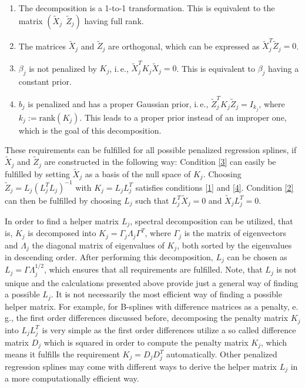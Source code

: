 \documentclass[12pt]{article}
\begin{document}
\begin{enumerate}
\item The decomposition is a 1-to-1 transformation. This is equivalent to the matrix $(\tilde{X}_j \:\:  \tilde{Z}_j)$ having full rank. \label{1}
\item The matrices $\tilde{X}_j$ and $\tilde{Z}_j$ are orthogonal, which can be expressed as $\tilde{X}_j^T \tilde{Z}_j = 0$. \label{2}
\item $\beta_j$ is not penalized by $K_j$, i.\,e., $\tilde{X}_j^T K_j \tilde{X}_j = 0$. This is equivalent to $\beta_j$ having a constant prior. \label{3}
\item $b_j$ is penalized and has a proper Gaussian prior, i.\,e., $\tilde{Z}_j^T K_j \tilde{Z}_j = I_{k_j}$, 
where $k_j := \text{rank}(K_j)$. This leads to a proper prior instead of an improper one, which is the goal of this decomposition. \label{4}
\end{enumerate}

These requirements can be fulfilled for all possible penalized regression splines, if $\tilde{X}_j$ and $\tilde{Z}_j$ are constructed in the following way: Condition \ref{3} can easily be fulfilled by setting $\tilde{X}_j$ as a basis of the null space of $K_j$. Choosing $\tilde{Z}_j =L_j (L_j^T L_j)^{-1}$ with $K_j =L_j L_j^T$ satisfies conditions \ref{1} and \ref{4}.  Condition \ref{2} can then be fulfilled by choosing $L_j$ such that $L_j^T\tilde{X}_j = 0$ and $\tilde{X}_jL_j^T = 0$.

 
In order to find a helper matrix $L_j$, spectral decomposition can be utilized, that is, $K_j$ is decomposed into $K_j = \Gamma_j \Lambda_j \Gamma^T$, where $\Gamma_j$ is the matrix of eigenvectors and $\Lambda_j$ the diagonal matrix of eigenvalues of $K_j$, both sorted by the eigenvalues in descending order. After performing this decomposition, $L_j$ can be chosen as $L_j = \Gamma \Lambda_j^{1/2}$, which ensures that all requirements are fulfilled. Note, that $L_j$ is not unique and the calculations presented above provide just a general way of finding a possible $L_j$. It is not necessarily the most efficient way of finding a possible helper matrix. For example, for B-splines with difference matrices as a penalty, e.\,g., the first order differences discussed before, decomposing the penalty matrix $K_j$ into $L_j L_j^T$ is very simple as the first order differences utilize a so called difference matrix $D_j$ which is squared in order to compute the penalty matrix $K_j$, which means it fulfills the requirement $K_j = D_jD_j^T$  automatically. Other penalized regression splines may come with different ways to derive the helper matrix $L_j$ in a more computationally efficient way.
\end{document}
